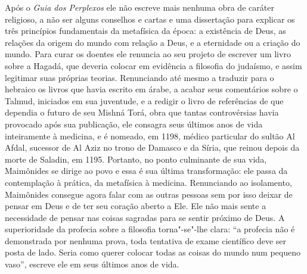 Após o \emph{Guia dos Perplexos} ele não escreve mais nenhuma obra de
caráter religioso, a não ser alguns conselhos e cartas e uma dissertação
para explicar os três princípios fundamentais da metafísica da época: a
existência de Deus, as relações da origem do mundo com relação a Deus, e
a eternidade ou a criação do mundo. Para curar os doentes ele renuncia
ao seu projeto de escrever um livro sobre a Hagadá, que deveria colocar
em evidência a filosofia do judaísmo, e assim legitimar suas próprias
teorias. Renunciando até mesmo a traduzir para o hebraico os livros que
havia escrito em árabe, a acabar seus comentários sobre o Talmud,
iniciados em sua juventude, e a redigir o livro de referências de que
dependia o futuro de seu Mishná Torá, obra que tantas
controvérsias havia provocado após sua publicação, ele consagra seus
últimos anos de vida inteiramente à medicina, e é nomeado, em 1198,
médico particular do sultão Al Afdal, sucessor de Al Aziz no trono de
Damasco e da Síria, que reinou depois da morte de Saladin, em 1195.
Portanto, no ponto culminante de sua vida, Maimônides se dirige ao povo
e essa é sua última transformação: ele passa da contemplação à prática,
da metafísica à medicina. Renunciando ao isolamento, Maimônides
consegue agora falar com as outras pessoas sem por isso deixar de pensar
em Deus e de ter seu coração aberto a Ele. Ele não mais sente a
necessidade de pensar nas coisas sagradas para se sentir próximo de
Deus. A superioridade da profecia sobre a filosofia torna"-se"-lhe clara:
``a profecia não é demonstrada por nenhuma prova, toda tentativa de
exame científico deve ser posta de lado. Seria como querer colocar
todas as coisas do mundo num pequeno vaso'', escreve ele em seus últimos
anos de vida.

